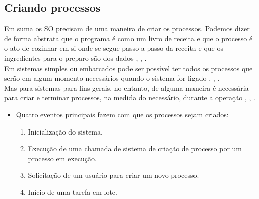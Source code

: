 \subsection{Criando processos}

Em suma os SO precisam de uma maneira de criar os processos. Podemos dizer de forma abstrata que o programa é como um livro de receita e que o processo é o ato de cozinhar em si onde se segue passo a passo da receita e que os ingredientes para o preparo são dos dados \cite{Tanenbaum2016}, \cite{info2020}, \cite{Morimoto2011}.\\
Em sistemas simples ou embarcados pode ser possível ter todos os processos que serão em algum momento necessários quando o sistema for ligado \cite{Tanenbaum2016}, \cite{info2020}, \cite{Morimoto2011}.\\
Mas para sistemas para fins gerais, no entanto, de alguma maneira é necessária para criar e terminar processos, na medida do necessário, durante a operação \cite{Tanenbaum2016}, \cite{info2020}, \cite{Morimoto2011}.\\

\begin{itemize}[label=$-$]
	\item Quatro eventos principais fazem com que os processos sejam criados:
    \begin{enumerate}
        \item Inicialização do sistema.
        \item Execução de uma chamada de sistema de criação de processo por um processo em execução.
        \item Solicitação de um usuário para criar um novo processo.
        \item Início de uma tarefa em lote. 
    \end{enumerate}
\end{itemize}

